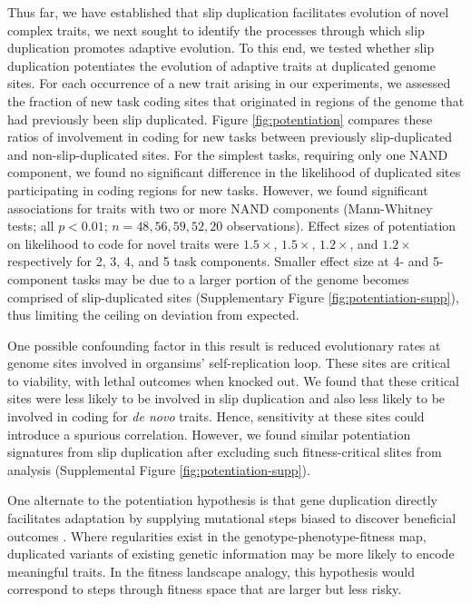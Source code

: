 Thus far, we have established that slip duplication facilitates evolution of novel complex traits, we next sought to  identify the processes through which slip duplication promotes adaptive evolution.
To this end, we tested whether slip duplication potentiates the evolution of adaptive traits at duplicated genome sites.
For each occurrence of a new trait arising in our experiments, we assessed the fraction of new task coding sites that originated in regions of the genome that had previously been slip duplicated.
Figure \ref{fig:potentiation} compares these ratios of involvement in coding for new tasks between previously slip-duplicated and non-slip-duplicated sites.
For the simplest tasks, requiring only one NAND component, we found no significant difference in the likelihood of duplicated sites participating in coding regions for new tasks.
However, we found significant associations for traits with two or more NAND components (Mann-Whitney tests; all $p < 0.01$; $n=48,56,59,52,20$ observations).
Effect sizes of potentiation on likelihood to code for novel traits were $1.5\times$, $1.5\times$, $1.2\times$, and $1.2\times$ respectively for 2, 3, 4, and 5 task components.
Smaller effect size at 4- and 5-component tasks may be due to a larger portion of the genome becomes comprised of slip-duplicated sites (Supplementary Figure \ref{fig:potentiation-supp}), thus limiting the ceiling on deviation from expected.

One possible confounding factor in this result is reduced evolutionary rates at genome sites involved in organsims' self-replication loop.
These sites are critical to viability, with lethal outcomes when knocked out.
We found that these critical sites were less likely to be involved in slip duplication and also less likely to be involved in coding for \textit{de novo} traits.
Hence, sensitivity at these sites could introduce a spurious correlation.
However, we found similar potentiation signatures from slip duplication after excluding such fitness-critical slites from analysis (Supplemental Figure \ref{fig:potentiation-supp}).

One alternate to the potentiation hypothesis is that gene duplication directly facilitates adaptation by supplying mutational steps biased to discover beneficial outcomes \citep{TODO}.
Where regularities exist in the genotype-phenotype-fitness map, duplicated variants of existing genetic information may be more likely to encode meaningful traits.
In the fitness landscape analogy, this hypothesis would correspond to steps through fitness space that are larger but less risky.

